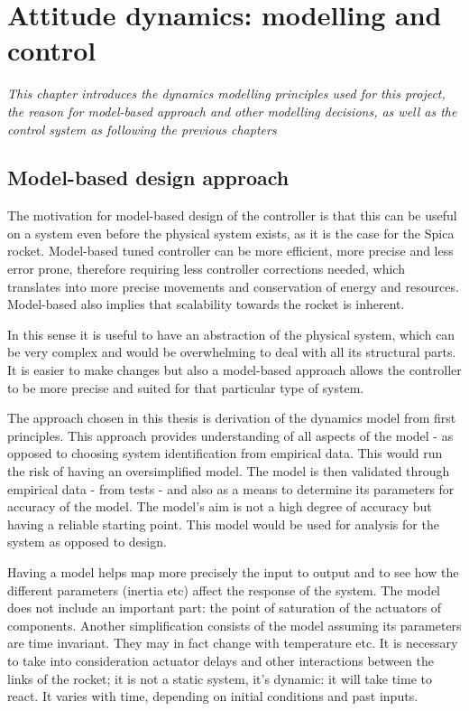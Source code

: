 \chapter{Attitude dynamics: modelling and control}

\newcommand\scalemath[2]{\scalebox{#1}{\mbox{\ensuremath{\displaystyle #2}}}}

\textit{This chapter introduces the dynamics modelling principles used for this project, the reason for model-based approach and other modelling decisions, as well as the control system as following the previous chapters}

\section{Model-based design approach}

The motivation for model-based design of the controller is that this can be useful on a system even before the physical system exists, as it is the case for the Spica rocket. Model-based tuned controller can be more efficient, more precise and less error prone, therefore requiring less controller corrections needed, which translates into more precise movements and conservation of energy and resources. Model-based also implies that scalability towards the rocket is inherent. 

In this sense it is useful to have an abstraction of the physical system, which can be very complex and would be overwhelming to deal with all its structural parts. It is easier to make changes but also a model-based approach allows the controller to be more precise and suited for that particular type of system.

The approach chosen in this thesis is derivation of the dynamics model from first principles. This approach provides understanding of all aspects of the model - as opposed to choosing system identification from empirical data. This would run the risk of having an oversimplified model. The model is then validated through empirical data - from tests - and also as a means to determine its parameters for accuracy of the model. The model’s aim is not a high degree of accuracy but having a reliable starting point. This model would be used for analysis for the  system as opposed to design.

Having a model helps map more precisely the input to output and to see how the different parameters (inertia etc) affect the response of the system. The model does not include an important part: the point of saturation of the actuators of components. Another simplification consists of the model assuming its parameters are time invariant. They may in fact change with temperature etc. It is necessary to take into consideration actuator delays and other interactions between the links of the rocket; it is not a static system, it’s dynamic: it will take time to react. It varies with time, depending on initial conditions and past inputs. 

